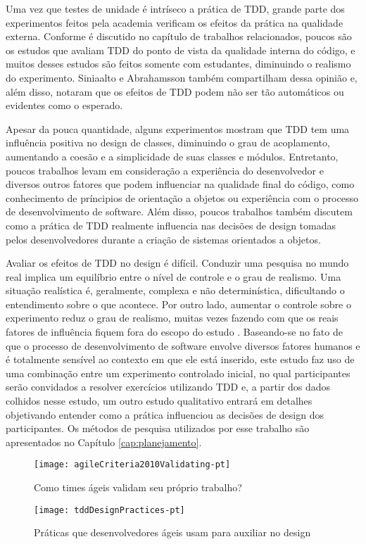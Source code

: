 Uma vez que testes de unidade é intríseco a prática de TDD, 
grande parte dos experimentos feitos pela academia verificam os
efeitos da prática na qualidade externa. Conforme é discutido no capítulo de
trabalhos relacionados, poucos são os estudos que avaliam TDD do
ponto de vista da qualidade interna do código, e muitos desses estudos
são feitos somente com estudantes, diminuindo o realismo do experimento. 
Siniaalto e Abrahamsson \cite{alarming-results} também
compartilham dessa opinião e, além disso, notaram que os efeitos de TDD podem 
não ser tão automáticos ou evidentes como o esperado.

Apesar da pouca quantidade, alguns experimentos mostram que TDD tem uma influência
positiva no design de classes, diminuindo o grau de acoplamento, aumentando
a coesão e a simplicidade de suas classes e módulos. Entretanto, poucos trabalhos
levam em consideração a experiência do desenvolvedor e diversos
outros fatores que podem influenciar na qualidade final do código, como conhecimento
de príncipios de orientação a objetos ou experiência com o processo de 
desenvolvimento de software. Além disso, poucos trabalhos também discutem como
a prática de TDD realmente influencia 
nas decisões de design tomadas pelos desenvolvedores durante a criação de sistemas 
orientados a objetos.

Avaliar os efeitos de TDD no design é difícil.
Conduzir uma pesquisa no mundo real implica um equilíbrio entre
o nível de controle e o grau de realismo. Uma situação realística é, geralmente, complexa e 
não determinística, dificultando o entendimento sobre o que acontece. Por outro
lado, aumentar o controle sobre o experimento reduz o grau de realismo, muitas
vezes fazendo com que os reais fatores de influência fiquem fora do escopo do 
estudo \cite{guidelines-case-study}.
Baseando-se no fato de que o processo de desenvolvimento de software envolve 
diversos fatores humanos e é totalmente sensível ao contexto em que ele está 
inserido, 
este estudo faz uso de uma combinação entre um experimento controlado inicial, no qual participantes serão
convidados a resolver exercícios utilizando TDD e, a partir dos dados colhidos nesse estudo, um outro
estudo qualitativo entrará em detalhes objetivando entender como a prática influenciou as decisões de design dos participantes.
Os métodos de pesquisa utilizados por
esse trabalho são apresentados no Capítulo \ref{cap:planejamento}.



\begin{figure}[ht]
  \begin{minipage}[b]{0.45\linewidth}
    \centering
    \texttt{[image: agileCriteria2010Validating-pt]}
    \caption{Como times ágeis validam seu próprio trabalho?}
    \label{fig:wambler-agile-2010}
  \end{minipage}
  \hspace{0.5cm}
  \begin{minipage}[b]{0.45\linewidth}
    \centering
    \texttt{[image: tddDesignPractices-pt]}
    \caption{Práticas que desenvolvedores ágeis usam para auxiliar no design}  
    \label{fig:wambler-tdd-2008}
  \end{minipage}
\end{figure}			

